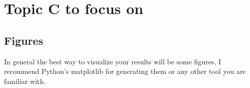 \documentclass{project-logbook}
\begin{document}
\section{Topic C to focus on} \label{sec:topic_c}
	\subsection{Figures} \label{sub:figures}

		\begin{HighlightedNote}{}
			In general the best way to visualize your results will be some figures, I recommend Python's matplotlib for generating them or any other tool you are familiar with.
		\end{HighlightedNote}



\end{document}
